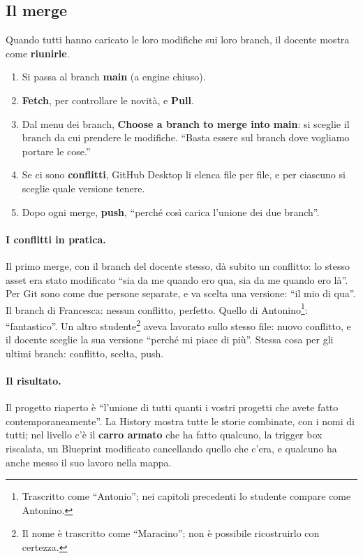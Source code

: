 \subsection{Il merge}

Quando tutti hanno caricato le loro modifiche sui loro branch, il docente
mostra come \textbf{riunirle}.
\begin{enumerate}
  \item Si passa al branch \textbf{main} (a engine chiuso).
  \item \textbf{Fetch}, per controllare le novità, e \textbf{Pull}.
  \item Dal menu dei branch, \textbf{Choose a branch to merge into main}: si
        sceglie il branch da cui prendere le modifiche. ``Basta essere sul
        branch dove vogliamo portare le cose.''
  \item Se ci sono \textbf{conflitti}, GitHub Desktop li elenca file per file, e
        per ciascuno si sceglie quale versione tenere.
  \item Dopo ogni merge, \textbf{push}, ``perché così carica l'unione dei due
        branch''.
\end{enumerate}

\paragraph{I conflitti in pratica.} Il primo merge, con il branch del docente
stesso, dà subito un conflitto: lo stesso asset era stato modificato ``sia da me
quando ero qua, sia da me quando ero là''. Per Git sono come due persone
separate, e va scelta una versione: ``il mio di qua''. Il branch di Francesca:
nessun conflitto, perfetto. Quello di Antonino\footnote{Trascritto come ``Antonio''; nei capitoli precedenti lo studente compare come Antonino.}: ``fantastico''. Un altro
studente\footnote{Il nome è trascritto come ``Maracino''; non è possibile
ricostruirlo con certezza.} aveva lavorato sullo stesso file: nuovo conflitto,
e il docente sceglie la sua versione ``perché mi piace di più''. Stessa cosa per
gli ultimi branch: conflitto, scelta, push.

\paragraph{Il risultato.} Il progetto riaperto è ``l'unione di tutti quanti i
vostri progetti che avete fatto contemporaneamente''. La History mostra tutte le
storie combinate, con i nomi di tutti; nel livello c'è il \textbf{carro armato}
che ha fatto qualcuno, la trigger box riscalata, un Blueprint modificato
cancellando quello che c'era, e qualcuno ha anche messo il suo lavoro nella
mappa.


